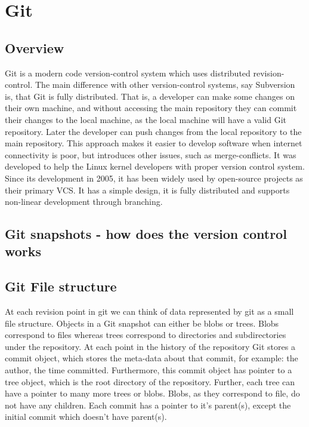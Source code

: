 \documentclass[12pt,twoside,notitlepage]{report}
\begin{document}
\section*{Git}
\subsection*{Overview}
Git is a modern code version-control system which uses distributed revision-control. The main difference with other version-control systems, say Subversion is, that Git is fully distributed. That is, a developer can make some changes on their own machine, and without accessing the main repository they can commit their changes to the local machine, as the local machine will have a valid Git repository. Later the developer can push changes from the local repository to the main repository. This approach makes it easier to develop software when internet connectivity is poor, but introduces other issues, such as merge-conflicts. It was developed to help the Linux kernel developers with proper version control system. Since its development in 2005, it has been widely used by open-source projects as their primary VCS. It has a simple design, it is fully distributed and supports non-linear development through branching.
\subsection*{Git snapshots - how does the version control works}
\subsection*{Git File structure}
At each revision point in git we can think of data represented by git as a small file structure. Objects in a Git snapshot can either be blobs or trees. Blobs correspond to files whereas trees correspond to directories and subdirectories under the repository. At each point in the history of the repository Git stores a commit object, which stores the meta-data about that commit, for example: the author, the time committed. Furthermore, this commit object has pointer to a tree object, which is the root directory of the repository. Further, each tree can have a pointer to many more trees or blobs. Blobs, as they correspond to file, do not have any children. Each commit has a pointer to it's parent(s), except the initial commit which doesn't have parent(s).
\end{document}
